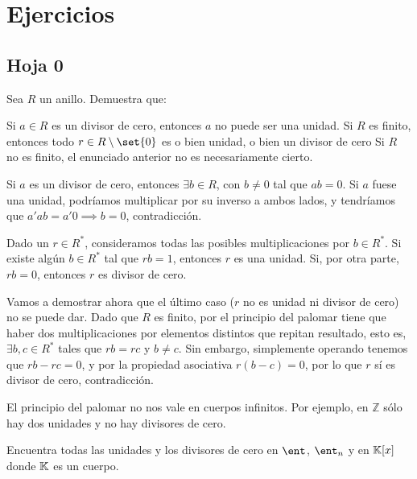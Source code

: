 \chapter{Ejercicios}
\setcounter{section}{-1} %
\section{Hoja 0}

\begin{problem}
Sea $R$ un anillo. Demuestra que:

\ppart Si $a \in R$ es un divisor de cero, entonces $a$ no puede ser una unidad.
\ppart Si $R$ es finito, entonces todo $r \in R \setminus \set{0}$ es o bien unidad, o bien un divisor de cero
\ppart Si $R$ no es finito, el enunciado anterior no es necesariamente cierto.
\solution


\spart

Si $a$ es un divisor de cero, entonces $∃b ∈ R$, con $b ≠ 0$ tal que $ab = 0$. Si $a$ fuese una unidad, podríamos multiplicar por su inverso a ambos lados, y tendríamos que $a'ab = a' 0 \implies b = 0$, contradicción.

\spart

Dado un $r ∈ R^*$, consideramos todas las posibles multiplicaciones por $b ∈ R^*$. Si existe algún $b ∈ R^*$ tal que $rb = 1$, entonces $r$ es una unidad. Si, por otra parte, $rb = 0$, entonces $r$ es divisor de cero.

Vamos a demostrar ahora que el último caso ($r$ no es unidad ni divisor de cero) no se puede dar. Dado que $R$ es finito, por el principio del palomar tiene que haber dos multiplicaciones por elementos distintos que repitan resultado, esto es, $∃b,c ∈ R^*$ tales que $rb = rc$ y $b ≠ c$. Sin embargo, simplemente operando tenemos que $rb - rc = 0$, y por la propiedad asociativa $r(b-c) = 0$, por lo que $r$ sí es divisor de cero, contradicción.

\spart

El principio del palomar no nos vale en cuerpos infinitos. Por ejemplo, en $ℤ$ sólo hay dos unidades y no hay divisores de cero.
\end{problem}

\begin{problem}
Encuentra todas las unidades y los divisores de cero en $\ent$, $\ent_n$ y en $\mathbb{K}[x]$ donde $\mathbb{K}$ es un cuerpo. %
\solution
\end{problem}

